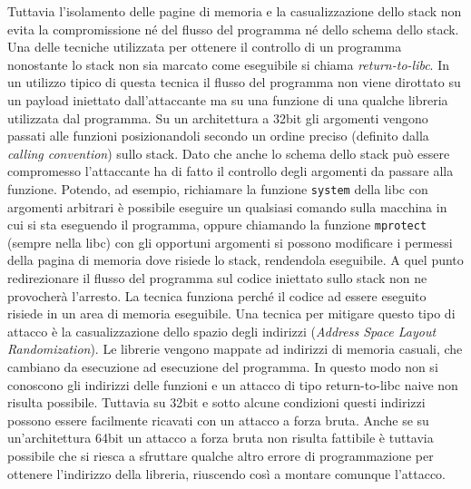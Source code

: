 Tuttavia l'isolamento delle pagine di memoria e la casualizzazione
dello stack non evita la compromissione né del flusso del programma né
dello schema dello stack. Una delle tecniche utilizzata per ottenere
il controllo di un programma nonostante lo stack non sia marcato come
eseguibile si chiama \emph{return-to-libc}\cite{c0ntex}. In un
utilizzo tipico di questa tecnica il flusso del programma non viene
dirottato su un payload iniettato dall'attaccante ma su una funzione
di una qualche libreria utilizzata dal programma. Su un architettura a
32bit gli argomenti vengono passati alle funzioni posizionandoli
secondo un ordine preciso (definito dalla \emph{calling convention})
sullo stack. Dato che anche lo schema dello stack può essere
compromesso l'attaccante ha di fatto il controllo degli argomenti da
passare alla funzione. Potendo, ad esempio, richiamare la funzione
\lstinline{system} della libc con argomenti arbitrari è possibile
eseguire un qualsiasi comando sulla macchina in cui si sta eseguendo il
programma, oppure chiamando la funzione \lstinline{mprotect} (sempre
nella libc) con gli opportuni argomenti si possono modificare i
permessi della pagina di memoria dove risiede lo stack, rendendola
eseguibile. A quel punto redirezionare il flusso del programma sul
codice iniettato sullo stack non ne provocherà l'arresto. La tecnica
funziona perché il codice ad essere eseguito risiede in un area di
memoria eseguibile. Una tecnica per mitigare questo tipo di attacco è
la casualizzazione dello spazio degli indirizzi (\emph{Address Space
  Layout Randomization}). Le librerie vengono mappate ad indirizzi di
memoria casuali, che cambiano da esecuzione ad esecuzione del
programma. In questo modo non si conoscono gli indirizzi delle
funzioni e un attacco di tipo return-to-libc naive non risulta
possibile. Tuttavia su 32bit e sotto alcune condizioni questi
indirizzi possono essere facilmente ricavati con un attacco a forza
bruta\cite{Shacham:2004}. Anche se su un'architettura 64bit un attacco
a forza bruta non risulta fattibile è tuttavia possibile che si riesca
a sfruttare qualche altro errore di programmazione per ottenere
l'indirizzo della libreria, riuscendo così a montare comunque
l'attacco.

